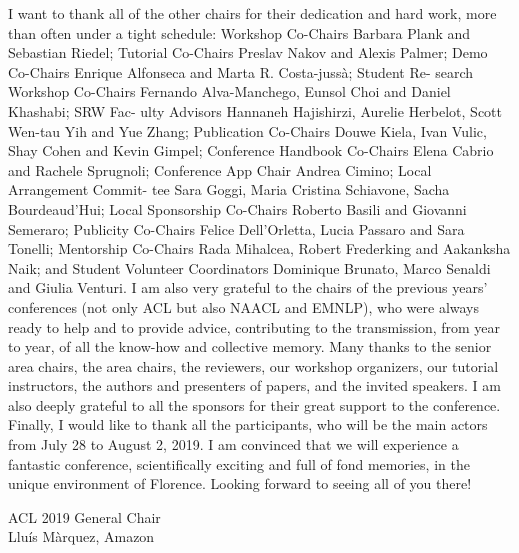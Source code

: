 I want to thank all of the other chairs for their dedication and hard work, more than often under a tight schedule: Workshop Co-Chairs Barbara Plank and Sebastian Riedel; Tutorial Co-Chairs Preslav Nakov and Alexis Palmer; Demo Co-Chairs Enrique Alfonseca and Marta R. Costa-jussà; Student Re- search Workshop Co-Chairs Fernando Alva-Manchego, Eunsol Choi and Daniel Khashabi; SRW Fac- ulty Advisors Hannaneh Hajishirzi, Aurelie Herbelot, Scott Wen-tau Yih and Yue Zhang; Publication Co-Chairs Douwe Kiela, Ivan Vulic, Shay Cohen and Kevin Gimpel; Conference Handbook Co-Chairs Elena Cabrio and Rachele Sprugnoli; Conference App Chair Andrea Cimino; Local Arrangement Commit- tee Sara Goggi, Maria Cristina Schiavone, Sacha Bourdeaud’Hui; Local Sponsorship Co-Chairs Roberto Basili and Giovanni Semeraro; Publicity Co-Chairs Felice Dell’Orletta, Lucia Passaro and Sara Tonelli; Mentorship Co-Chairs Rada Mihalcea, Robert Frederking and Aakanksha Naik; and Student Volunteer Coordinators Dominique Brunato, Marco Senaldi and Giulia Venturi.
I am also very grateful to the chairs of the previous years’ conferences (not only ACL but also NAACL and EMNLP), who were always ready to help and to provide advice, contributing to the transmission, from year to year, of all the know-how and collective memory.
Many thanks to the senior area chairs, the area chairs, the reviewers, our workshop organizers, our tutorial instructors, the authors and presenters of papers, and the invited speakers.
I am also deeply grateful to all the sponsors for their great support to the conference.
Finally, I would like to thank all the participants, who will be the main actors from July 28 to August 2, 2019. I am convinced that we will experience a fantastic conference, scientifically exciting and full of fond memories, in the unique environment of Florence. Looking forward to seeing all of you there!

ACL 2019 General Chair \\
Lluís Màrquez, Amazon

